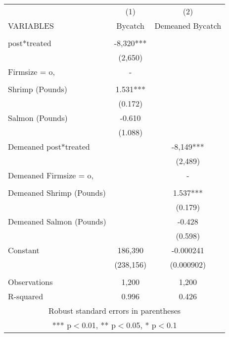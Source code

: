 \begin{tabular}{lcc} \hline
 & (1) & (2) \\
VARIABLES & Bycatch & Demeaned Bycatch \\ \hline
 &  &  \\
post*treated & -8,320*** &  \\
 & (2,650) &  \\
Firmsize = o, & - &  \\
 &  &  \\
Shrimp (Pounds) & 1.531*** &  \\
 & (0.172) &  \\
Salmon (Pounds) & -0.610 &  \\
 & (1.088) &  \\
Demeaned post*treated &  & -8,149*** \\
 &  & (2,489) \\
Demeaned Firmsize = o, &  & - \\
 &  &  \\
Demeaned Shrimp (Pounds) &  & 1.537*** \\
 &  & (0.179) \\
Demeaned Salmon (Pounds) &  & -0.428 \\
 &  & (0.598) \\
Constant & 186,390 & -0.000241 \\
 & (238,156) & (0.000902) \\
 &  &  \\
Observations & 1,200 & 1,200 \\
 R-squared & 0.996 & 0.426 \\ \hline
\multicolumn{3}{c}{ Robust standard errors in parentheses} \\
\multicolumn{3}{c}{ *** p$<$0.01, ** p$<$0.05, * p$<$0.1} \\
\end{tabular}
